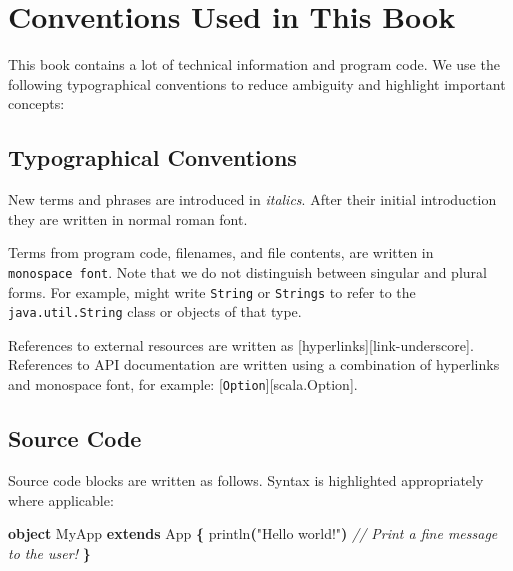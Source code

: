 \documentclass[11pt,a5paper,]{book}
\newenvironment{Shaded}{\begin{snugshade}}{\end{snugshade}}
\newcommand{\CommentTok}[1]{\textcolor[rgb]{0.56,0.35,0.01}{\textit{#1}}}
\newcommand{\FunctionTok}[1]{\textcolor[rgb]{0.00,0.00,0.00}{#1}}
\newcommand{\KeywordTok}[1]{\textcolor[rgb]{0.13,0.29,0.53}{\textbf{#1}}}
\newcommand{\NormalTok}[1]{#1}
\newcommand{\OperatorTok}[1]{\textcolor[rgb]{0.81,0.36,0.00}{\textbf{#1}}}
\newcommand{\StringTok}[1]{\textcolor[rgb]{0.31,0.60,0.02}{#1}}
\begin{document}
\hypertarget{conventions-used-in-this-book}{%
\section*{Conventions Used in This
Book}\label{conventions-used-in-this-book}}

This book contains a lot of technical information and program code. We
use the following typographical conventions to reduce ambiguity and
highlight important concepts:

\hypertarget{typographical-conventions}{%
\subsection*{Typographical
Conventions}\label{typographical-conventions}}

New terms and phrases are introduced in \emph{italics}. After their
initial introduction they are written in normal roman font.

Terms from program code, filenames, and file contents, are written in
\texttt{monospace\ font}. Note that we do not distinguish between
singular and plural forms. For example, might write \texttt{String} or
\texttt{Strings} to refer to the \texttt{java.util.String} class or
objects of that type.

References to external resources are written as
{[}hyperlinks{]}{[}link-underscore{]}. References to API documentation
are written using a combination of hyperlinks and monospace font, for
example: {[}\texttt{Option}{]}{[}scala.Option{]}.

\hypertarget{source-code}{%
\subsection*{Source Code}\label{source-code}}

Source code blocks are written as follows. Syntax is highlighted
appropriately where applicable:

\begin{Shaded}
\begin{Highlighting}[]
\KeywordTok{object}\NormalTok{ MyApp }\KeywordTok{extends}\NormalTok{ App }\OperatorTok{\{}
  \FunctionTok{println}\OperatorTok{(}\StringTok{"Hello world!"}\OperatorTok{)} \CommentTok{// Print a fine message to the user!}
\OperatorTok{\}}
\end{Highlighting}
\end{Shaded}
\end{document}

